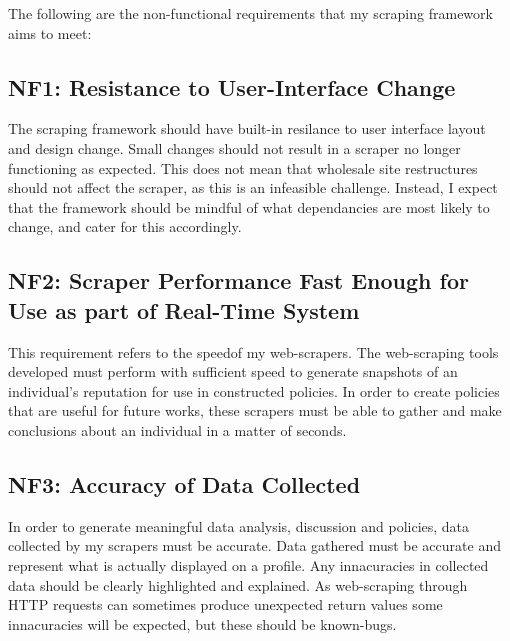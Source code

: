 The following are the non-functional requirements that my scraping framework aims to meet:

\subsection{NF1: Resistance to User-Interface Change}

The scraping framework should have built-in resilance to user interface layout and design change. Small changes should not result in a scraper no longer functioning as expected. This does not mean that wholesale site restructures should not affect the scraper, as this is an infeasible challenge. Instead, I expect that the framework should be mindful of what dependancies are most likely to change, and cater for this accordingly. 




\subsection{NF2: Scraper Performance Fast Enough for Use as part of Real-Time System}

This requirement refers to the speedof my web-scrapers. The web-scraping tools developed must perform with sufficient speed to generate snapshots of an individual's reputation for use in constructed policies. In order to create policies that are useful for future works, these scrapers must be able to gather and make conclusions about an individual in a matter of seconds. 

\subsection{NF3: Accuracy of Data Collected}

In order to generate meaningful data analysis, discussion and policies, data collected by my scrapers must be accurate. Data gathered must be accurate and represent what is actually displayed on a profile. Any innacuracies in collected data should be clearly highlighted and explained. As web-scraping through HTTP requests can sometimes produce unexpected return values some innacuracies will be expected, but these should be known-bugs. 




